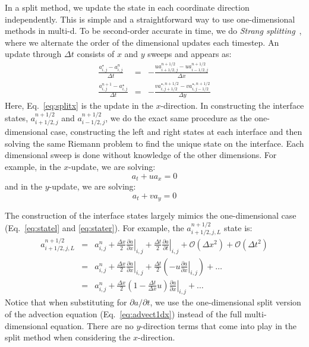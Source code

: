 In a split method, we update the state in each coordinate direction
independently.  This is simple and a straightforward way to use
one-dimensional methods in multi-d.  To be second-order accurate in
time, we do {\em Strang splitting}~\cite{strang}, where we alternate
the order of the dimensional updates each timestep.  An update through
$\Delta t$ consists of $x$ and $y$ sweeps and appears as:
\begin{eqnarray}
 \frac{a_{i,j}^\star - a_{i,j}^n}{\Delta t} &=&
  - \frac{ u a_{i+1/2,j}^{n+1/2} - u a_{i-1/2,j}^{n+1/2} }{\Delta x} \label{eq:splitx}\\
 \frac{a_{i,j}^{n+1} - a_{i,j}^\star}{\Delta t} &=&
  - \frac{ v a_{i,j+1/2}^{\star,n+1/2} - v a_{i,j-1/2}^{\star,n+1/2} }{\Delta y} \label{eq:splity}
\end{eqnarray}
Here, Eq.~\ref{eq:splitx} is the update in the $x$-direction.  In
constructing the interface states, $a_{i+1/2,j}^{n+1/2}$ and
$a_{i-1/2,j}^{n+1/2}$, we do the exact same procedure as the
one-dimensional case, constructing the left and right states at each
interface and then solving the same Riemann problem to find the unique
state on the interface.  Each dimensional sweep is done without
knowledge of the other dimensions.  For example, in the $x$-update, we
are solving:
\begin{equation}
a_t + u a_x = 0
\label{eq:advect1dx}
\end{equation}
and in the $y$-update, we are solving:
\begin{equation}
a_t + v a_y = 0
\end{equation}

The construction of the interface states largely mimics the one-dimensional
case (Eq.~\ref{eq:statel} and \ref{eq:stater}).  For example, the
$a_{i+1/2,j,L}^{n+1/2}$ state is:
\begin{eqnarray}
a_{i+1/2,j,L}^{n+1/2} &=& a_{i,j}^n + 
  \frac{\Delta x}{2} \left .\frac{\partial a}{\partial x} \right |_{i,j} + 
  \frac{\Delta t}{2} \left .\frac{\partial a}{\partial t} \right |_{i,j} + 
  \mathcal{O}(\Delta x^2) + \mathcal{O}(\Delta t^2) \nonumber \\
 &=& a_{i,j}^n + 
   \frac{\Delta x}{2} \left .\frac{\partial a}{\partial x} \right |_{i,j} + 
   \frac{\Delta t}{2} \left ( 
   - u \left .\frac{\partial a}{\partial x} \right |_{i,j} \right
   ) + \ldots \nonumber \\
    &=& a_{i,j}^n + 
   \frac{\Delta x}{2} \left ( 1 - \frac{\Delta t}{\Delta x} u \right ) 
   \left .\frac{\partial a}{\partial x} \right |_{i,j} +
   \ldots \label{eq:statels}
\end{eqnarray}
Notice that when substituting for $\partial a / \partial t$, we use
the one-dimensional split version of the advection equation
(Eq.~\ref{eq:advect1dx}) instead of the full multi-dimensional
equation.  There are no $y$-direction terms that come into play in the
split method when considering the $x$-direction.

